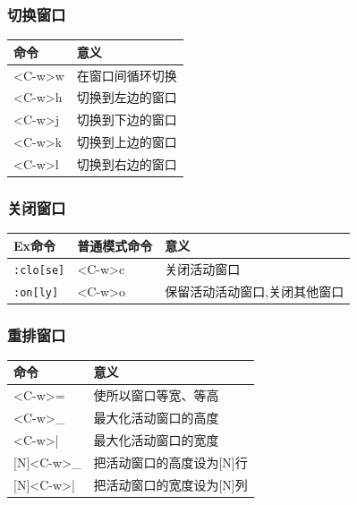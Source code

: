 \subsubsection{切换窗口}
\begin{longtable}{ll}\hline\hline

	\textbf{命令} & \textbf{意义}\\

    \endhead

	<C-w>w & 在窗口间循环切换 \\

	<C-w>h & 切换到左边的窗口 \\

	<C-w>j & 切换到下边的窗口 \\

	<C-w>k & 切换到上边的窗口 \\

	<C-w>l & 切换到右边的窗口 \\

    \hline
\end{longtable} 

\subsubsection{关闭窗口}
\begin{longtable}{lll}\hline\hline

	\textbf{Ex命令} &\textbf{普通模式命令}& \textbf{意义}\\

    \endhead

	\texttt{:clo[se]} & <C-w>c & 关闭活动窗口 \\

		\texttt{:on[ly]} & <C-w>o & 保留活动活动窗口,关闭其他窗口 \\

    \hline
\end{longtable} 

\subsubsection{重排窗口}
\begin{longtable}{ll}\hline\hline

	\textbf{命令} & \textbf{意义}\\

    \endhead

	<C-w>= & 使所以窗口等宽、等高 \\

	<C-w>\_ & 最大化活动窗口的高度 \\
	
	<C-w>| & 最大化活动窗口的宽度 \\

	[N]<C-w>\_ & 把活动窗口的高度设为[N]行 \\

	[N]<C-w>| & 把活动窗口的宽度设为[N]列 \\

    \hline
\end{longtable} 

